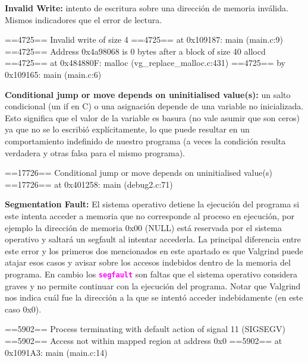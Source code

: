 \documentclass[]{scrartcl}
\newcommand{\hl}[1]{\textcolor{magenta}{\textbf{\texttt{#1}}}}
\begin{document}
\textbf{Invalid Write:} intento de escritura sobre una dirección de memoria inválida. Mismos indicadores que el error de lectura.
\begin{bashbox}[]
  ==4725== Invalid write of size 4
  ==4725==    at 0x109187: main (main.c:9)
  ==4725==  Address 0x4a98068 is 0 bytes after a block of size 40 allocd
  ==4725==    at 0x484880F: malloc (vg_replace_malloc.c:431)
  ==4725==    by 0x109165: main (main.c:6)
\end{bashbox}

\textbf{Conditional jump or move depends on uninitialised value(s):} un salto condicional (un if en C) o una asignación depende de una variable no inicializada. Esto significa que el valor de la variable es basura (no vale asumir que son ceros) ya que no se lo escribió explícitamente, lo que puede resultar en un comportamiento indefinido de nuestro programa (a veces la condición resulta verdadera y otras falsa para el mismo programa).
\begin{bashbox}[]
  ==17726== Conditional jump or move depends on uninitialised value(s)
  ==17726==    at 0x401258: main (debug2.c:71)
\end{bashbox}

\textbf{Segmentation Fault:} El sistema operativo detiene la ejecución del programa si este intenta acceder a memoria que no corresponde al proceso en ejecución, por ejemplo la dirección de memoria 0x00 (NULL) está reservada por el sistema operativo y saltará un segfault al intentar accederla. La principal diferencia entre este error y los primeros dos mencionados en este apartado es que Valgrind puede atajar esos casos y avisar sobre los accesos indebidos dentro de la memoria del programa. En cambio los \hl{segfault} son faltas que el sistema operativo considera graves y no permite continuar con la ejecución del programa. Notar que Valgrind nos indica cuál fue la dirección a la que se intentó acceder indebidamente (en este caso 0x0).
\begin{bashbox}[]
  ==5902== Process terminating with default action of signal 11 (SIGSEGV)
  ==5902==  Access not within mapped region at address 0x0
  ==5902==    at 0x1091A3: main (main.c:14)
\end{bashbox}
\end{document}
